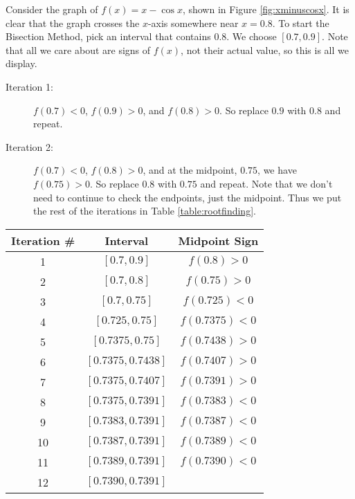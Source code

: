 {Consider the graph of $f(x) = x-\cos x$, shown in Figure \ref{fig:xminuscosx}. It is clear that the graph crosses the $x$-axis somewhere near $x=0.8$. To start the Bisection Method, pick an interval that contains $0.8$. We choose $[0.7,0.9]$. Note that all we care about are signs of $f(x)$, not their actual value, so this is all we display.


		\begin{description}
		\item [Iteration 1:] $f(0.7) < 0$, $f(0.9) > 0$, and $f(0.8) >0$. So replace $0.9$ with $0.8$ and repeat.
		\item	[Iteration 2:]	$f(0.7)<0$, $f(0.8) > 0$, and at the midpoint, $0.75$, we have $f(0.75) >0 $. So replace $0.8$ with $0.75$ and repeat. Note that we don't need to continue to check the endpoints, just the midpoint. Thus we put the rest of the iterations in Table \ref{table:rootfinding}.
		\end{description}
		
%
			{\footnotesize\noindent \begin{tabular}{ccc}
			Iteration \# & Interval & Midpoint Sign \\ \hline
			1		& $[0.7,0.9]$ & $f(0.8) >0$ \\
			2 & $[0.7,0.8] $ & $f(0.75) >0$ \\
			3 & $[0.7,0.75]$ & $f(0.725)<0$\\
			4 & $[0.725,0.75]$ & $f(0.7375)<0$\\
			5 & $[0.7375,0.75]$ & $f(0.7438)>0$\\
			6 & $[0.7375,0.7438]$ & $f(0.7407)>0$\\
			7 & $[0.7375,0.7407]$ & $f(0.7391)>0$\\
			8 & $[0.7375,0.7391]$ & $f(0.7383)<0$\\
			9 & $[0.7383,0.7391]$ & $f(0.7387)<0$\\
			10 & $[0.7387,0.7391]$ & $f(0.7389)<0$\\
			11 & $[0.7389,0.7391]$ & $f(0.7390)<0$\\
			12 & $[0.7390,0.7391]$ &   \\
			\end{tabular}
			}%
			
}
